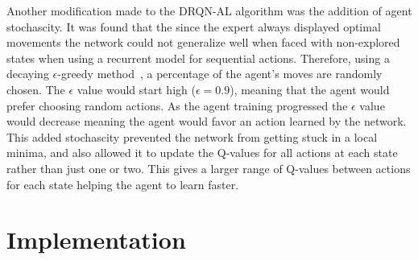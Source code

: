 \documentclass[12pt,american]{report}
\begin{document}
Another modification made to the DRQN-AL algorithm was the addition of agent stochascity.  It was found that the since the expert always displayed optimal movements the network could not generalize well when faced with non-explored states when using a recurrent model for sequential actions.  Therefore, using a decaying $\epsilon$-greedy method~\cite{Eden}, a percentage of the agent's moves are randomly chosen.  The $\epsilon$ value would start high ($\epsilon=0.9$), meaning that the agent would prefer choosing random actions.  As the agent training progressed the $\epsilon$ value would decrease meaning the agent would favor an action learned by the network. This added stochascity prevented the network from getting stuck in a local minima, and also allowed it to update the Q-values for all actions at each state rather than just one or two.  This gives a larger range of Q-values between actions for each state helping the agent to learn faster.

\chapter{Implementation}
\label{sec:implementation}
\end{document}
